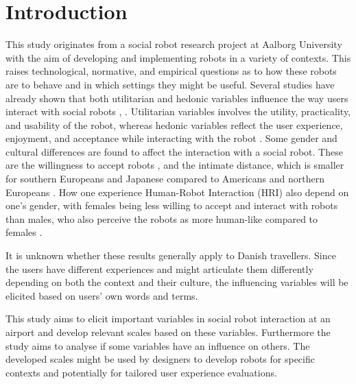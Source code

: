 \section{Introduction}
\label{Introduction}
%
This study originates from a social robot research project at Aalborg University with the aim of developing and implementing robots in a variety of contexts. This raises technological, normative, and empirical questions as to how these robots are to behave and in which settings they might be useful. Several studies have already shown that both utilitarian and hedonic variables influence the way users interact with social robots \cite{PDF:ExploringInfluencingVariable}, \cite{PDF:SharingALifeHarvey}. Utilitarian variables involves the utility, practicality, and usability of the robot, whereas hedonic variables reflect the user experience, enjoyment, and acceptance while interacting with the robot \cite{PDF:ExploringInfluencingVariable}. Some gender and cultural differences are found to affect the interaction with a social robot. These are the willingness to accept robots \cite{PDF:InTheCompanyofRobots}, and the intimate distance, which is smaller for southern Europeans and Japanese compared to Americans and northern Europeans \cite{PDF:HowMayIServeYou}. How one experience Human-Robot Interaction (HRI) also depend on one's gender, with females being less willing to accept and interact with robots than males, who also perceive the robots as more human-like compared to females \cite{PDF:ExploringInfluencingVariable}.

It is unknown whether these results generally apply to Danish travellers. Since the users have different experiences and might articulate them differently depending on both the context and their culture, the influencing variables will be elicited based on users' own words and terms.

This study aims to elicit important variables in social robot interaction at an airport and develop relevant scales based on these variables. Furthermore the study aims to analyse if some variables have an influence on others. The developed scales might be used by designers to develop robots for specific contexts and potentially for tailored user experience evaluations.



